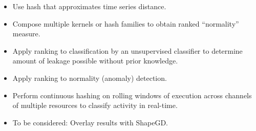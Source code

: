 \documentclass[a4paper]{article}
\begin{document}
\begin{itemize}
    \item Use hash that approximates time series distance.
    \item Compose multiple kernels or hash families to obtain ranked ``normality'' measure.
    \item Apply ranking to classification by an unsupervised classifier to determine amount of leakage possible without prior knowledge.
    \item Apply ranking to normality (anomaly) detection.
    \item Perform continuous hashing on rolling windows of execution across channels of multiple resources to classify activity in real-time.
    \item To be considered: Overlay results with ShapeGD\@.
\end{itemize}



\end{document}
